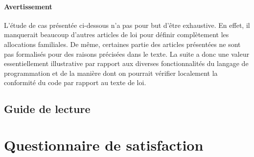 \documentclass[11pt, french, a4paper]{article}
\begin{document}
\paragraph{Avertissement} L'étude de cas présentée ci-dessous n'a pas pour but d'être exhaustive. En effet, il manquerait beaucoup d'autres articles de loi pour définir complètement les allocations familiales. De même, certaines partie des articles présentées ne sont pas formalisés pour des raisons précisées dans le texte. La suite a donc une valeur essentiellement illustrative par rapport aux diverses fonctionnalités du langage de programmation et de la manière dont on pourrait vérifier localement la conformité du code par rapport au texte de loi.

\subsection{Guide de lecture}





\section{Questionnaire de satisfaction}


\end{document}
